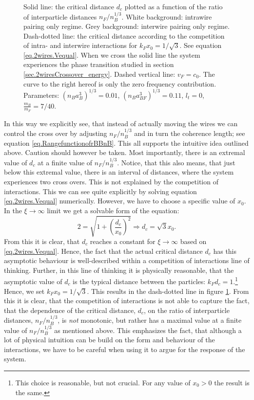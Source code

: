 \begin{figure} 
\begin{center}  
  
\caption{Solid line: the critical distance $d_c$ plotted as a function of the ratio of interparticle distances $n_F/n_B^{1/3}$. White background: intrawire pairing only regime. Grey background: interwire pairing only regime. Dash-dotted line: the critical distance according to the competition of intra- and interwire interactions for $k_Fx_0 = 1/\sqrt{3}$. See equation \eqref{eq.2wires.Vequal}. When we cross the solid line the system experiences the phase transition studied in section \ref{sec.2wiresCrossover_energy}. Dashed vertical line: $v_F = c_0$. The curve to the right hereof is only the zero frequency contribution. Parameters: $(n_Ba_B^3)^{1/3} = 0.01$, $(n_Ba_{BF}^3)^{1/3} = 0.11$, $l_t = 0$, $\frac{m_B}{m_F} = 7/40$. }  
\label{fig.twowirescrossovernBdepend}  
\end{center}    
\end{figure}

In this way we explicitly see, that instead of actually moving the wires we can control the cross over by adjusting $n_F/n_B^{1/3}$ and in turn the coherence length; see equation \eqref{eq.RangefunctionofrBBnB}. This all supports the intuitive idea outlined above. Caution should however be taken. Most importantly, there is an extremal value of $d_c$ at a finite value of $n_F/n_B^{1/3}$. Notice, that this also means, that just below this extremal value, there is an interval of distances, where the system experiences two cross overs. This is not explained by the competition of interactions. This we can see quite explicitly by solving equation \eqref{eq.2wires.Vequal} numerically. However, we have to choose a specific value of $x_0$. In the $\xi \to \infty$ limit we get a solvable form of the equation:
\begin{equation}
2 = \sqrt{1 + \left(\frac{d_c}{x_0}\right)^2} \Rightarrow d_c = \sqrt{3} x_0. \nonumber
\end{equation}
From this it is clear, that $d_c$ reaches a constant for $\xi \to \infty$ based on \eqref{eq.2wires.Vequal}. Hence, the fact that the actual critical distance $d_c$ has this asymptotic behaviour is well-described within a competition of interactions line of thinking. Further, in this line of thinking it is physically reasonable, that the asymptotic value of $d_c$ is the typical distance between the particles: $k_Fd_c = 1$.\footnote{This choice is reasonable, but not crucial. For any value of $x_0 > 0$ the result is the same.} Hence, we set $k_Fx_0 = 1/\sqrt{3}$. This results in the dash-dotted line in figure \ref{fig.twowirescrossovernBdepend}. From this it is clear, that the competition of interactions is not able to capture the fact, that the dependence of the critical distance, $d_c$, on the ratio of interparticle distances, $n_F/n_B^{1/3}$, is \textit{not} monotonic, but rather has a maximal value at a finite value of $n_F/n_B^{1/3}$ as mentioned above. This emphasizes the fact, that although a lot of physical intuition can be build on the form and behaviour of the interactions, we have to be careful when using it to argue for the response of the system.

